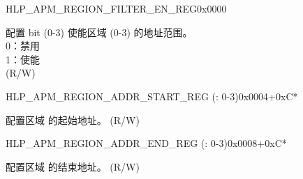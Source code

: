 \begin{register}{H}{LP\_APM\_REGION\_FILTER\_EN\_REG}{0x0000}\label{regdesc:LPAPMREGIONFILTERENREG}
%
%
\regnewline%
\begin{regdesc}\begin{reglist}
\label{fielddesc:LPAPMREGIONFILTEREN}\item [LP\_APM\_REGION\_FILTER\_EN] 配置 bit  (0-3) 使能区域  (0-3) 的地址范围。\\ 
0：禁用 \\ 
1：使能  \\ (R/W)
\end{reglist}\end{regdesc}
\end{register}

\begin{register}{H}{LP\_APM\_REGION\_ADDR\_START\_REG (: 0-3)}{0x0004+0xC*}\label{regdesc:LPAPMREGION0ADDRSTARTREG}
%
\regnewline%
\begin{regdesc}\begin{reglist}
\label{fielddesc:LPAPMREGION0ADDRSTART}\item [LP\_APM\_REGION\regindex{n}\_ADDR\_START] 配置区域  的起始地址。 (R/W)
\end{reglist}\end{regdesc}
\end{register}


\begin{register}{H}{LP\_APM\_REGION\_ADDR\_END\_REG (: 0-3)}{0x0008+0xC*} \label{regdesc:LPAPMREGION0ADDRENDREG}
%
\regnewline%
\begin{regdesc}\begin{reglist}
\label{fielddesc:LPAPMREGION0ADDREND}\item [LP\_APM\_REGION\regindex{n}\_ADDR\_END] 配置区域  的结束地址。 (R/W)
\end{reglist}\end{regdesc}
\end{register}
















